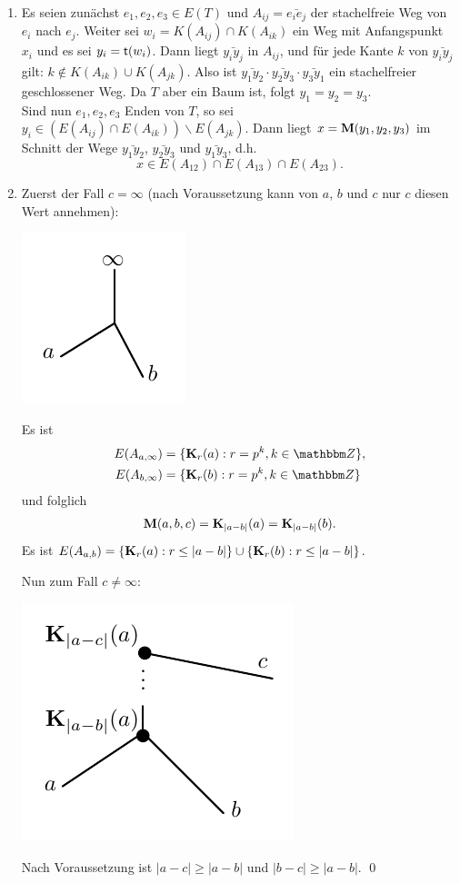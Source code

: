 \documentclass[a4paper, 12pt, twoside]{article}
\begin{document}
\bew\ \begin{enumerate}
\item Es seien zunächst $e_1,e_2,e_3\in E(T)$ und
$A_{ij}=\bar{e_i e_j}$ der stachelfreie Weg von $e_i$ nach $e_j$.
Weiter sei $w_i=K(A_{ij})\cap K(A_{ik})$ ein Weg mit Anfangspunkt
$x_i$ und es sei $y_i=\mathsf{t}(w_i)$.
Dann liegt $\bar{y_i y_j}$ in $A_{ij}$, und für jede Kante $k$ von
$\bar{y_i y_j}$ gilt: $k\not\in K(A_{ik})\cup K(A_{jk})$.
Also ist $\bar{y_1 y_2}\cdot\bar{y_2 y_3}\cdot\bar{y_3 y_1}$
ein stachelfreier
geschlossener Weg. Da $T$ aber ein Baum ist, folgt $y_1=y_2=y_3$.\\
Sind nun $e_1,e_2,e_3$ Enden von $T$, so sei
$y_i\in (E(A_{ij})\cap E(A_{ik}))\backslash E(A_{jk})$. Dann liegt
$x=\mathbf{M}(y_1,y_2,y_3)$ im Schnitt der Wege $\bar{y_1 y_2}$,
$\bar{y_2 y_3}$ und $\bar{y_1 y_3}$, d.h.
\[
x \in E(A_{12})\cap E(A_{13}) \cap E(A_{23}).
\]
\item
Zuerst der Fall $c=\infty$ (nach Voraussetzung kann von $a$, $b$ und
$c$ nur
$c$ diesen Wert annehmen):
\begin{center}
	\includegraphics{grugraImages/enden1}
\end{center}
Es ist
\begin{align*}
E(A_{a,\infty}) &= \{\KU_r(a) : r=p^k, k\in\ZZ \}, \\
E(A_{b,\infty}) &= \{\KU_r(b) : r=p^k, k\in\ZZ \}
\end{align*}
und folglich
\[
\mathbf{M}(a,b,c)=\mathbf{K}_{|a-b|}(a)=\mathbf{K}_{|a-b|}(b).
\]
Es ist $E(A_{a,b})=\{\mathbf{K}_r(a):r\leq |a-b|\}\cup
\{\mathbf{K}_r(b):r\leq|a-b|\}$.

Nun zum Fall $c\neq\infty$:
\begin{center}
	\includegraphics{grugraImages/enden2}
\end{center}
Nach Voraussetzung ist $|a-c|\geq |a-b|$ und $|b-c|\geq |a-b|$.
\qed
\end{enumerate}
\end{document}

